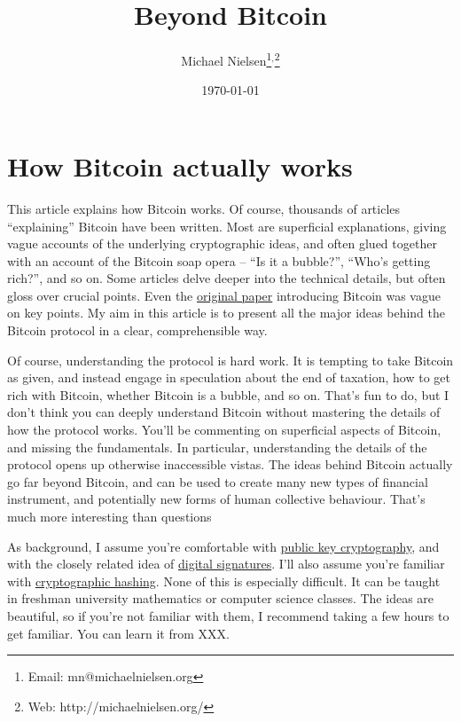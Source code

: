 \documentclass[12pt]{book}
\newcommand{\link}[2]{\href{#1}{#2}}
\begin{document}
\title{Beyond Bitcoin}
\author{Michael Nielsen\thanks{Email: mn@michaelnielsen.org}$^{,}$\thanks{Web: http://michaelnielsen.org/}}
\date{\today}

\maketitle

\pagestyle{headings}

\tableofcontents

\chapter{How Bitcoin actually works}

%
%
This article explains how Bitcoin works.  Of course, thousands of
articles ``explaining'' Bitcoin have been written.  Most are
superficial explanations, giving vague accounts of the underlying
cryptographic ideas, and often glued together with an account of the
Bitcoin soap opera -- ``Is it a bubble?'', ``Who's getting rich?'',
and so on.  Some articles delve deeper into the technical details, but
often gloss over crucial points.  Even the
\link{http://bitcoin.org/bitcoin.pdf}{original paper} introducing
Bitcoin was vague on key points.  My aim in this article is to present
all the major ideas behind the Bitcoin protocol in a clear,
comprehensible way.

%
%
Of course, understanding the protocol is hard work.  It is tempting to
take Bitcoin as given, and instead engage in speculation about the end
of taxation, how to get rich with Bitcoin, whether Bitcoin is a
bubble, and so on.  That's fun to do, but I don't think you can deeply
understand Bitcoin without mastering the details of how the protocol
works.  You'll be commenting on superficial aspects of Bitcoin, and
missing the fundamentals.  In particular, understanding the details of
the protocol opens up otherwise inaccessible vistas.  The ideas behind
Bitcoin actually go far beyond Bitcoin, and can be used to create many
new types of financial instrument, and potentially new forms of human
collective behaviour.  That's much more interesting than questions

%
%
As background, I assume you're comfortable with
\link{http://en.wikipedia.org/wiki/Public-key_cryptography}{public key
  cryptography}, and with the closely related idea of
\link{https://en.wikipedia.org/wiki/Digital_signature}{digital
  signatures}.  I'll also assume you're familiar with
\link{https://en.wikipedia.org/wiki/Cryptographic_hash_function}{cryptographic
  hashing}.  None of this is especially difficult.  It can be taught
in freshman university mathematics or computer science classes.  The
ideas are beautiful, so if you're not familiar with them, I recommend
taking a few hours to get familiar.  You can learn it from XXX.
\end{document}
